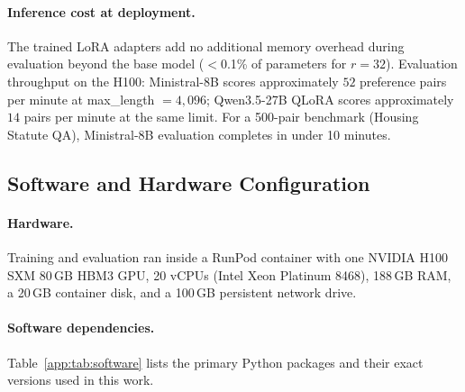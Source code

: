 \documentclass{article}
\theoremstyle{plain}
\theoremstyle{definition}
\theoremstyle{remark}
\begin{document}
\paragraph{Inference cost at deployment.}
The trained LoRA adapters add no additional memory overhead during evaluation beyond the base model ($<$0.1\% of parameters for $r\!=\!32$).  Evaluation throughput on the H100: Ministral-8B scores approximately $52$ preference pairs per minute at max\_length $= 4{,}096$; Qwen3.5-27B QLoRA scores approximately $14$ pairs per minute at the same limit.  For a 500-pair benchmark (Housing Statute QA), Ministral-8B evaluation completes in under 10 minutes.


\subsection{Software and Hardware Configuration}
\label{app:software}

\paragraph{Hardware.}
Training and evaluation ran inside a RunPod container with one NVIDIA H100 SXM
80\,GB HBM3 GPU, 20 vCPUs (Intel Xeon Platinum 8468), 188\,GB RAM, a 20\,GB
container disk, and a 100\,GB persistent network drive.

\paragraph{Software dependencies.}
Table~\ref{app:tab:software} lists the primary Python packages and their exact versions used in this work.
\end{document}
